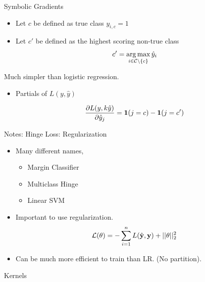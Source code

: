 \documentclass{beamer}
\begin{document}
\begin{frame}{Symbolic Gradients}

  \begin{itemize}
  \item   Let $c$ be defined as true class $y_{i, c} = 1$  
  \item   Let $c'$ be defined as the highest scoring non-true class 
    \[c' = \argmax_{i \in \mcC \setminus\{c\}} \hat{y}_i \] 
  \end{itemize}
  
  Much simpler than logistic regression.

  \begin{itemize}
  \item Partials of $L(y, \hat{y})$

  \[ \frac{\partial L(y,k \hat{y})}{\partial \hat{y}_j} = \mathbf{1}(j = c) - \mathbf{1}(j = c')  \]

   \end{itemize}
\end{frame}


\begin{frame}{Notes: Hinge Loss: Regularization}
  \begin{itemize}
  \item   Many different names,
  \begin{itemize}
  \item Margin Classifier
  \item Multiclass Hinge
  \item Linear SVM
  \end{itemize}

  \item Important to use regularization.  
  \[ \mathcal{L}(\theta) = - \sum_{i=1}^n L(\hat{\mathbf{y}}, \mathbf{y}) + ||\theta||^2_2\] 

  \item Can be much more efficient to train than LR. (No partition).

  \end{itemize}
\end{frame}


\begin{frame}{Kernels}
  
\end{frame}
\end{document}
